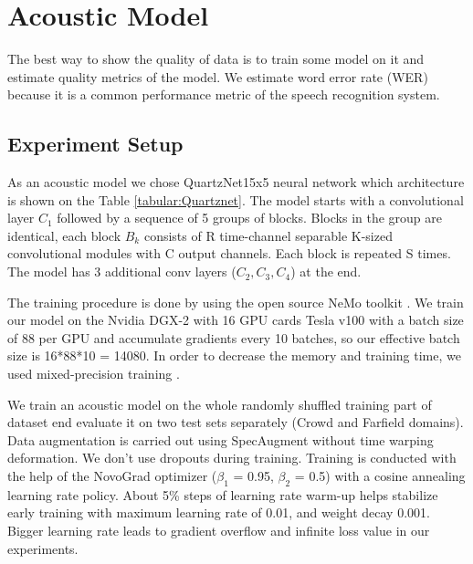 \documentclass[a4paper]{article}
\begin{document}
\section{Acoustic Model}

The best way to show the quality of data is to train some model on it and estimate quality metrics of the model. We estimate word error rate (WER) because it is a common performance metric of the speech recognition system. 

\subsection{Experiment Setup}

As an acoustic model we chose QuartzNet15x5 neural network \cite{kriman2020quartznet} which architecture is shown on the Table \ref{tabular:Quartznet}. The model starts with a convolutional layer $C_1$ followed by a sequence of 5 groups of blocks. Blocks in the group are identical, each block $B_k$ consists of R time-channel separable K-sized convolutional modules with C output channels. Each block is repeated S times. The model has 3 additional conv layers ($C_2, C_3, C_4$) at the end.

The training procedure is done by using the open source NeMo toolkit \cite{kuchaiev2019nemo}. We train our model on the Nvidia DGX-2 with 16 GPU cards Tesla v100 with a batch size of 88 per GPU and accumulate gradients every 10 batches, so our effective batch size is 16*88*10 = 14080. In order to decrease the memory and training time, we used mixed-precision training \cite{micikevicius2017mixed}.

We train an acoustic model on the whole randomly shuffled training part of dataset end evaluate it on two test sets separately (Crowd and Farfield domains). Data augmentation is carried out using SpecAugment \cite{park2019specaugment} without time warping deformation. We don't use dropouts during training. Training is conducted with the help of the NovoGrad \cite{ginsburg2019stochastic} optimizer ($\beta_1$ = 0.95, $\beta_2$ = 0.5) with a cosine annealing learning rate policy. About 5\% steps of learning rate warm-up helps stabilize early training with maximum learning rate of 0.01, and weight decay 0.001. Bigger learning rate leads to gradient overflow and infinite loss value in our experiments. 
\end{document}
